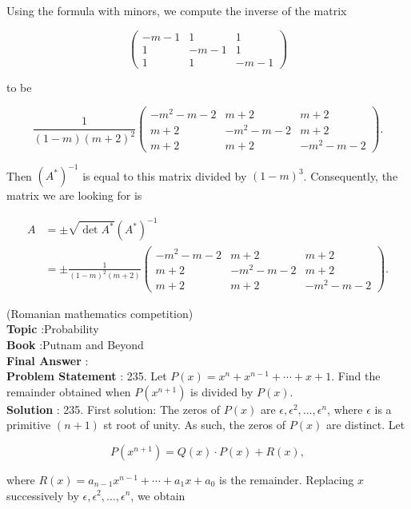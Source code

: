 \documentclass[10pt]{article}
\begin{document}
Using the formula with minors, we compute the inverse of the matrix

$$
\left(\begin{array}{ccc}
-m-1 & 1 & 1 \\
1 & -m-1 & 1 \\
1 & 1 & -m-1
\end{array}\right)
$$

to be

$$
\frac{1}{(1-m)(m+2)^{2}}\left(\begin{array}{ccc}
-m^{2}-m-2 & m+2 & m+2 \\
m+2 & -m^{2}-m-2 & m+2 \\
m+2 & m+2 & -m^{2}-m-2
\end{array}\right) .
$$

Then $\left(A^{*}\right)^{-1}$ is equal to this matrix divided by $(1-m)^{3}$. Consequently, the matrix we are looking for is

$$
\begin{aligned}
A &=\pm \sqrt{\operatorname{det} A^{*}}\left(A^{*}\right)^{-1} \\
&=\pm \frac{1}{(1-m)^{2}(m+2)}\left(\begin{array}{ccc}
-m^{2}-m-2 & m+2 & m+2 \\
m+2 & -m^{2}-m-2 & m+2 \\
m+2 & m+2 & -m^{2}-m-2
\end{array}\right) .
\end{aligned}
$$

(Romanian mathematics competition)
\\
\textbf{Topic} :Probability\\
\textbf{Book} :Putnam and Beyond\\
\textbf{Final Answer} :\\


\textbf{Problem Statement} :
235. Let $P(x)=x^{n}+x^{n-1}+\cdots+x+1$. Find the remainder obtained when $P\left(x^{n+1}\right)$ is divided by $P(x)$.
\\
\textbf{Solution} :
235. First solution: The zeros of $P(x)$ are $\epsilon, \epsilon^{2}, \ldots, \epsilon^{n}$, where $\epsilon$ is a primitive $(n+1)$ st root of unity. As such, the zeros of $P(x)$ are distinct. Let

$$
P\left(x^{n+1}\right)=Q(x) \cdot P(x)+R(x),
$$

where $R(x)=a_{n-1} x^{n-1}+\cdots+a_{1} x+a_{0}$ is the remainder. Replacing $x$ successively by $\epsilon, \epsilon^{2}, \ldots, \epsilon^{n}$, we obtain
\end{document}
